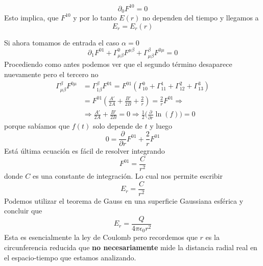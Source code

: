 \begin{equation}
    \partial_0 F^{10} = 0
\end{equation}
Esto implica, que $F^{10}$ y por lo tanto $E(r)$ no dependen del tiempo y llegamos a 
\begin{equation}
    E_r = E_r(r)
\end{equation}

Si ahora tomamos de entrada el caso $\alpha=0$ 
\begin{equation}
\partial_1 F^{01} + \Gamma^0_{\mu\beta}F^{\mu\beta} + \Gamma^\beta_{\mu\beta}F^{0\mu} = 0
\end{equation}
Procediendo como antes podemos ver que el segundo término desaparece nuevamente pero el tercero no
\begin{equation}
\begin{split}
\Gamma^\beta_{\mu\beta} F^{0\mu} &= \Gamma^\beta_{1\beta} F^{01} = F^{01}(\Gamma^0_{10} +\Gamma^1_{11}+\Gamma^2_{12}+\Gamma^3_{13}) \\
&= F^{01}(\frac{A'}{2A} + \frac{B'}{2B} + \frac{2}{r}) = \frac{2}{r}F^{01} \Rightarrow \\
&\Rightarrow \frac{A'}{2A} + \frac{B'}{2B} = 0 \Rightarrow \frac{1}{2} \biggr(\frac{\partial}{\partial r}\ln(f)\biggr) = 0  
\end{split}
\end{equation}
porque sabíamos que $f(t)$ solo depende de $t$ y luego
\begin{equation}
    0 = \frac{\partial}{\partial r}F^{01} + \frac{2}{r}F^{01}
\end{equation}
Está última ecuación es fácil de resolver integrando 
\begin{equation}
    F^{01} = \frac{C}{r^2}
\end{equation}
donde $C$ es una constante de integración. Lo cual nos permite escribir
\begin{equation}
    E_r = \frac{C}{r^2}
\end{equation}
Podemos utilizar el teorema de Gauss en una superficie Gaussiana esférica y concluir que
\begin{equation}
    E_r = \frac{Q}{4\pi\epsilon_0 r^2}
    \label{Er}
\end{equation}
Esta es esencialmente la ley de Coulomb pero recordemos que $r$ es la circunferencia reducida que \textbf{no necesariamente} mide la distancia radial real en el espacio-tiempo que estamos analizando. 

